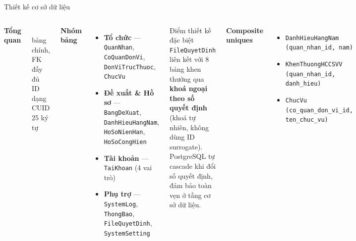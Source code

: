 \documentclass[aspectratio=43,xcolor=table]{beamer}
\begin{document}
\begin{frame}{Thiết kế cơ sở dữ liệu}
  \begin{columns}[T,onlytextwidth]
    \textbf{Tổng quan}\\
    \begin{block}{}
      \\
      bảng chính, FK đầy đủ\\
      ID dạng CUID 25 ký tự
    \end{block}

    \textbf{Nhóm bảng}
    \begin{itemize}\small
      \item \textbf{Tổ chức} --- \texttt{QuanNhan}, \texttt{CoQuanDonVi}, \texttt{DonViTrucThuoc}, \texttt{ChucVu}
      \item \textbf{Đề xuất \& Hồ sơ} --- \texttt{BangDeXuat}, \texttt{DanhHieuHangNam}, \texttt{HoSoNienHan}, \texttt{HoSoCongHien}
      \item \textbf{Tài khoản} --- \texttt{TaiKhoan} (4 vai trò)
      \item \textbf{Phụ trợ} --- \texttt{SystemLog}, \texttt{ThongBao}, \texttt{FileQuyetDinh}, \texttt{SystemSetting}
    \end{itemize}

    \begin{block}{Điểm thiết kế đặc biệt}
      \scriptsize
      \texttt{FileQuyetDinh} liên kết với 8 bảng khen thưởng qua \textbf{khoá ngoại theo số quyết định} (khoá tự nhiên, không dùng ID surrogate).\\[0.2cm]
      PostgreSQL tự cascade khi đổi số quyết định, đảm bảo toàn vẹn ở tầng cơ sở dữ liệu.
    \end{block}

    \textbf{Composite uniques}
    \begin{itemize}\scriptsize
      \item \texttt{\scriptsize DanhHieuHangNam}\\\hspace*{0.3cm}\texttt{\scriptsize (quan\_nhan\_id, nam)}
      \item \texttt{\scriptsize KhenThuongHCCSVV}\\\hspace*{0.3cm}\texttt{\scriptsize (quan\_nhan\_id, danh\_hieu)}
      \item \texttt{\scriptsize ChucVu}\\\hspace*{0.3cm}\texttt{\scriptsize (co\_quan\_don\_vi\_id, ten\_chuc\_vu)}
    \end{itemize}
  \end{columns}
\end{frame}
\end{document}
